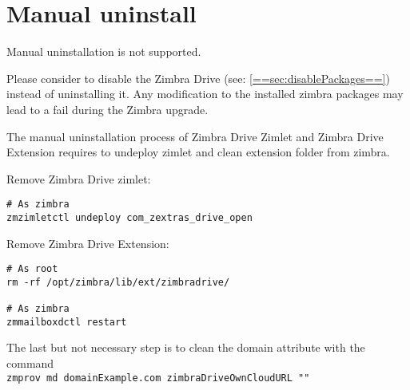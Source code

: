 \section{Manual uninstall}

\begin{comment}
WARNING:
\end{comment}
\begin{warning}
    Manual uninstallation is not supported.

    Please consider to disable the Zimbra Drive (see: \ref{==sec:disablePackages==}) instead of uninstalling it.
    Any modification to the installed zimbra packages may lead to a fail during the Zimbra upgrade.
\end{warning}

The manual uninstallation process of Zimbra Drive Zimlet and Zimbra Drive Extension requires to undeploy zimlet and clean extension folder from zimbra.

Remove Zimbra Drive zimlet:
\begin{verbatim}
# As zimbra
zmzimletctl undeploy com_zextras_drive_open
\end{verbatim}
Remove Zimbra Drive Extension:
\begin{verbatim}
# As root
rm -rf /opt/zimbra/lib/ext/zimbradrive/

# As zimbra
zmmailboxdctl restart
\end{verbatim}
The last but not necessary step is to clean the domain attribute with the command\\
\texttt{zmprov md domainExample.com zimbraDriveOwnCloudURL ""}
